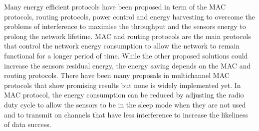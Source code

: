 Many energy efficient protocols have been proposed in term of the MAC protocols, routing protocols, power control and energy harvesting to overcome the problems of interference to maximise the throughput and the sensors energy to prolong the network lifetime. 
MAC and routing protocols are the main protocols that control the network energy consumption to allow the network to remain functional for a longer period of time. While the other proposed solutions could increase the sensors residual energy, the energy saving depends on the MAC and routing protocols.
There have been many proposals in multichannel MAC protocols that show promising results but none is widely implemented yet. In MAC protocol, the energy consumption can be reduced by adjusting the radio duty cycle to allow the sensors to be in the sleep mode when they are not used and to transmit on channels that have less interference to increase the likeliness of data success.
 




